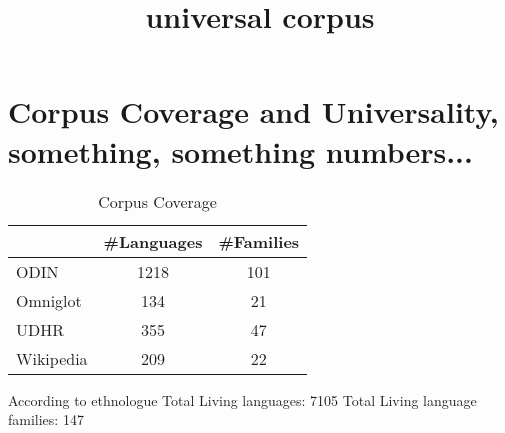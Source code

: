 \documentclass[11pt]{article}
\title{\textbf{universal corpus}}
\date{}
\begin{document}
\maketitle

\section{Corpus Coverage and Universality, something, something numbers...}

\begin{table}
\centering
    \begin{tabular}{l|cc}
    ~         & \#Languages & \#Families \\ \hline
    ODIN      & 1218       & 101       \\
    Omniglot  & 134        & 21        \\
    UDHR      & 355        & 47        \\
    Wikipedia & 209        & 22       \\
    \end{tabular}
\caption{Corpus Coverage}
\end{table}

According to ethnologue
Total Living languages: 7105
Total Living language families: 147
\end{document}
